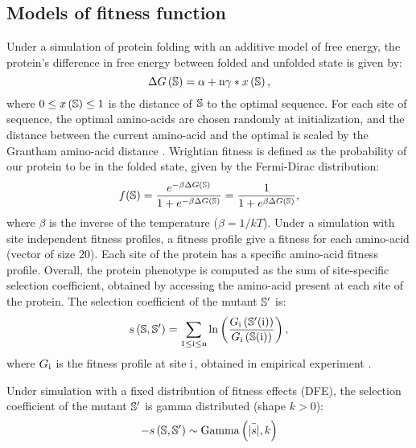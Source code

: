 \subsection{Models of fitness function}
\label{MatMet:folding}

Under a simulation of protein folding with an additive model of free energy, the protein's difference in free energy between folded and unfolded state is given by:
\begin{equation*}
\Delta G\left(\mathbb{S}\right) = \alpha + \text{n} \gamma * x\left(\mathbb{S}\right), 
\end{equation*}
where $0 \leq x\left(\mathbb{S}\right) \leq 1$ is the distance of $\mathbb{S}$ to the optimal sequence.
For each site of sequence, the optimal amino-acids are chosen randomly at initialization, and the distance between the current amino-acid and the optimal is scaled by the Grantham amino-acid distance \citep{Grantham1974}.
Wrightian fitness is defined as the probability of our protein to be in the folded state, given by the Fermi-Dirac distribution: 
\begin{equation}
f(\mathbb{S}) = \dfrac{e^{-\beta \Delta G\left(\mathbb{S}\right) }}{1 + e^{-\beta \Delta G\left(\mathbb{S}\right) }} = \dfrac{1}{1 + e^{\beta \Delta G\left(\mathbb{S}\right) }}, 
\end{equation}
where $\beta$ is the inverse of the temperature ($\beta=1/kT$).
Under a simulation with site independent fitness profiles, a fitness profile give a fitness for each amino-acid (vector of size $20$).
Each site of the protein has a specific amino-acid fitness profile.
Overall, the protein phenotype is computed as the sum of site-specific selection coefficient, obtained by accessing the amino-acid present at each site of the protein.
The selection coefficient of the mutant $\mathbb{S}'$ is:
\begin{equation}
s \left( \mathbb{S},\mathbb{S}'\right) = \sum_{1 \leq \text{i} \leq \text{n}} \ln \left( \dfrac{G_{\text{i}} \left(\mathbb{S}'(\text{i}) \right)}{G_{\text{i}} \left(\mathbb{S}(\text{i}) \right)} \right) ,
\end{equation}
where $G_{\text{i}}$ is the fitness profile at site $\text{i}$, obtained in empirical experiment \citep{Bloom2017}.

Under simulation with a fixed distribution of fitness effects (DFE), the selection coefficient of the mutant $\mathbb{S}'$ is gamma distributed (shape $k > 0$):
\begin{equation}
- s \left( \mathbb{S},\mathbb{S}'\right) \sim \text{Gamma} \left( \bar{|s|}, k \right)
\end{equation}
